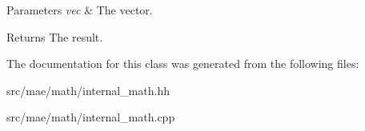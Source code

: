 \begin{DoxyParams}{Parameters}
{\em vec} & The vector. \\
\hline
\end{DoxyParams}
\begin{DoxyReturn}{Returns}
The result. 
\end{DoxyReturn}


The documentation for this class was generated from the following files\-:\begin{DoxyCompactItemize}
\item 
src/mae/math/internal\-\_\-math.\-hh\item 
src/mae/math/internal\-\_\-math.\-cpp\end{DoxyCompactItemize}
